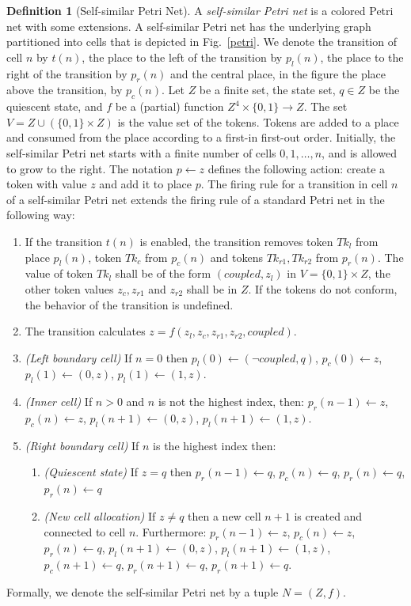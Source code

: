 \documentclass[pre,showpacs,showkeys,preprint]{revtex4}
\theoremstyle{definition}
\newtheorem{defn}{Definition}
\begin{document}
\begin{defn}[Self-similar Petri Net]
A {\em self-similar Petri net} is a colored Petri net with some extensions.
A self-similar Petri net has the underlying graph partitioned into cells that is depicted in Fig.~\ref{petri}.
We denote the transition of cell $n$ by $t(n)$, the place to the left of the transition by
$p_l(n)$, the place to the right of the transition by $p_r(n)$ and the central place, in the figure the place above the transition, by $p_c(n)$.
Let $Z$ be a finite set, the state set, $q \in Z$ be the quiescent state, and $f$ be a (partial) function
 $Z^4 \times \{0,1\} \rightarrow Z$.
The set $V=Z \cup (\{0,1\} \times Z)$ is the value set of the tokens.
Tokens are added to a place and consumed from the place according to a first-in first-out order.
Initially, the self-similar Petri net starts with a finite number of cells $0, 1, \ldots, n$, and is allowed to grow to the right.
The notation $p \leftarrow z$ defines the following action:
create a token with value $z$ and add it to place $p$.
The firing rule for a transition in cell $n$ of a self-similar Petri net extends the firing rule of a standard Petri net in the following way:
\begin{enumerate}
\item If the transition $t(n)$ is enabled, the transition
removes token $\mathit{Tk}_l$ from place $p_l(n)$, token $\mathit{Tk}_c$ from $p_c(n)$ and
tokens $\mathit{Tk}_{r1}, \mathit{Tk}_{r2}$ from $p_r(n)$.
The value of token $\mathit{Tk}_{l}$ shall be of the form $(\mathit{coupled}, z_l)$ in $V=\{0,1\} \times Z$,
the other token values $z_c, z_{r1}$ and $z_{r2}$ shall be in $Z$.
If the tokens do not conform, the behavior of the transition is undefined.
\item
The transition calculates $z = f(z_l, z_c, z_{r1}, z_{r2}, \mathit{coupled})$.
\item
\emph{(Left boundary cell)}
If $n = 0$ then
$p_l(0) \leftarrow (\neg coupled, q)$, $p_c(0) \leftarrow z$, $p_l(1) \leftarrow (0, z)$, $p_l(1) \leftarrow (1,z)$.
\item
\emph{(Inner cell)}
If $n > 0$ and $n$ is not the highest index, then:
$p_r(n-1) \leftarrow z$, $p_c(n) \leftarrow z$, $p_l(n+1) \leftarrow (0, z)$, $p_l(n+1) \leftarrow (1, z)$.
\item \emph{(Right boundary cell)}
If $n$ is the highest index then:
\begin{enumerate}
\item \emph{(Quiescent state)}
\label{firing-rule-quiescent}
If $z = q$ then
$p_r(n-1) \leftarrow q$, $p_c(n) \leftarrow q$, $p_r(n) \leftarrow q$, $p_r(n) \leftarrow q$
\item \emph{(New cell allocation)}
If $z \neq q$ then a new cell $n + 1$ is created and connected to cell $n$.
Furthermore: $p_r(n-1) \leftarrow z$, $p_c(n) \leftarrow z$, $p_r(n) \leftarrow q$,
$p_l(n+1) \leftarrow (0, z)$, $p_l(n+1) \leftarrow (1, z)$,
$p_c(n + 1) \leftarrow q$, $p_r(n + 1) \leftarrow q$, $p_r(n + 1) \leftarrow q$.
\end{enumerate}
\end{enumerate}
Formally, we denote the self-similar Petri net by a tuple $N = (Z, f)$.
\end{defn}
\end{document}
